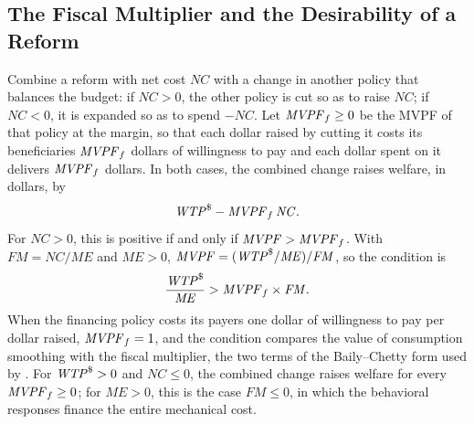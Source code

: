 \subsection{The Fiscal Multiplier and the Desirability of a Reform}

Combine a reform with net cost $\mathit{NC}$ with a change in another policy that balances the budget: if $\mathit{NC}>0$, the other policy is cut so as to raise $\mathit{NC}$; if $\mathit{NC}<0$, it is expanded so as to spend $-\mathit{NC}$. Let $\mathit{MVPF}_f\geq0$ be the MVPF of that policy at the margin, so that each dollar raised by cutting it costs its beneficiaries $\mathit{MVPF}_f$ dollars of willingness to pay and each dollar spent on it delivers $\mathit{MVPF}_f$ dollars. In both cases, the combined change raises welfare, in dollars, by
\begin{equation*}
\mathit{WTP}^{\$}-\mathit{MVPF}_f\,\mathit{NC}.
\end{equation*}
For $\mathit{NC}>0$, this is positive if and only if $\mathit{MVPF}>\mathit{MVPF}_f$. With $\mathit{FM}=\mathit{NC}/\mathit{ME}$ and $\mathit{ME}>0$, $\mathit{MVPF}=(\mathit{WTP}^{\$}/\mathit{ME})/\mathit{FM}$, so the condition is
\begin{equation*}
\frac{\mathit{WTP}^{\$}}{\mathit{ME}}>\mathit{MVPF}_f\times\mathit{FM}.
\end{equation*}
When the financing policy costs its payers one dollar of willingness to pay per dollar raised, $\mathit{MVPF}_f=1$, and the condition compares the value of consumption smoothing with the fiscal multiplier, the two terms of the Baily--Chetty form used by \citet{haller2022welfare}. For $\mathit{WTP}^{\$}>0$ and $\mathit{NC}\leq0$, the combined change raises welfare for every $\mathit{MVPF}_f\geq0$; for $\mathit{ME}>0$, this is the case $\mathit{FM}\leq0$, in which the behavioral responses finance the entire mechanical cost.
